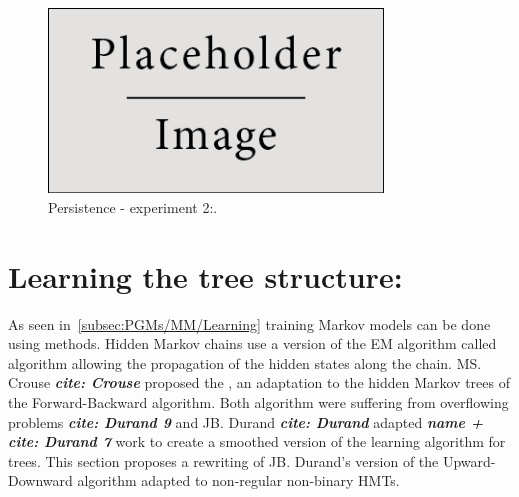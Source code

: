 \documentclass[a4paper,11pt]{report}
\begin{document}
		\begin{figure}
				\begin{center}
					\includegraphics[width=3.5in]{placeholder.jpg}
					\caption[Persistence - experiment 2.]{Persistence - experiment 2:.} %
					\label{fig:Persistence - 2}
				\end{center}
		\end{figure}
		
		
  \section{Learning the tree structure:}
    \label{sec:SHMT/Learning}
    
    As seen in~\ref{subsec:PGMs/MM/Learning} training Markov  models can be done using  methods. Hidden Markov chains use a version of the EM algorithm called  algorithm allowing the propagation of the hidden states along the chain. MS. Crouse \textbf{\textit{cite: Crouse}} proposed the , an adaptation to the hidden Markov trees of the Forward-Backward algorithm. Both algorithm were suffering from overflowing problems \textbf{\textit{cite: Durand 9 }} and JB. Durand \textbf{\textit{cite: Durand}} adapted \textbf{\textit{name + cite: Durand 7}} work to create a smoothed version of the learning algorithm for trees. This section proposes a rewriting of JB. Durand's version of the Upward-Downward algorithm adapted to non-regular non-binary HMTs.\\
       
\end{document}
